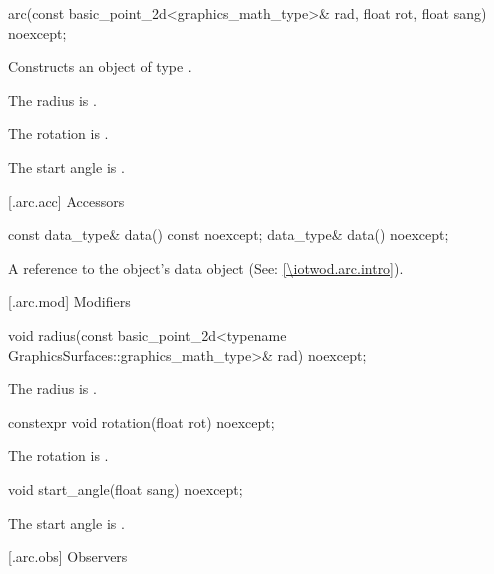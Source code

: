 %
\begin{itemdecl}
arc(const basic_point_2d<graphics_math_type>& rad,
  float rot, float sang) noexcept;
\end{itemdecl}
\begin{itemdescr}
\pnum
\effects
Constructs an object of type .

\pnum
The radius is .

\pnum
The rotation is .

\pnum
The start angle is .
\end{itemdescr}

 [\iotwod.arc.acc] {Accessors}%

%
\begin{itemdecl}
const data_type& data() const noexcept;
data_type& data() noexcept;
\end{itemdecl}
\begin{itemdescr}
\pnum
\returns A reference to the  object's data object (See: \ref{\iotwod.arc.intro}).
\end{itemdescr}

 [\iotwod.arc.mod] {Modifiers}

%
\begin{itemdecl}
void radius(const basic_point_2d<typename GraphicsSurfaces::graphics_math_type>& rad) noexcept;
\end{itemdecl}
\begin{itemdescr}
\pnum
\effects The radius is .
\end{itemdescr}

%
\begin{itemdecl}
constexpr void rotation(float rot) noexcept;
\end{itemdecl}
\begin{itemdescr}
\pnum
\effects The rotation is .
\end{itemdescr}

%
\begin{itemdecl}
void start_angle(float sang) noexcept;
\end{itemdecl}
\begin{itemdescr}
\pnum
\effects The start angle is .
\end{itemdescr}

 [\iotwod.arc.obs] {Observers}

